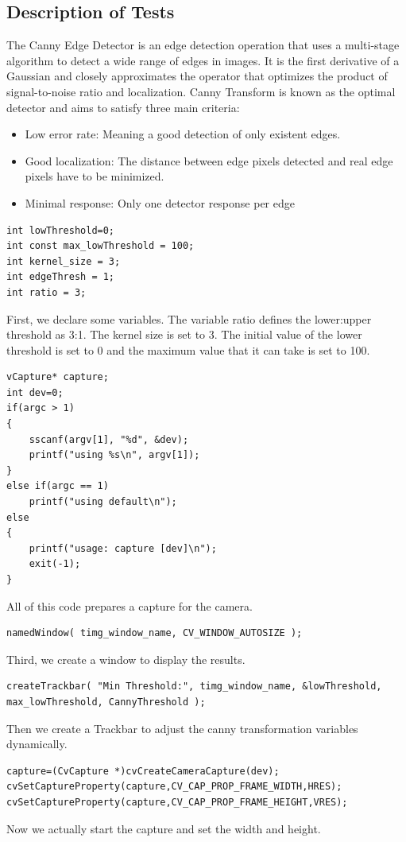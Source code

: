\documentclass{article}
\begin{document}
\subsection*{Description of Tests}
The Canny Edge Detector is an edge detection operation that uses a multi-stage algorithm to detect a wide range of edges in images. It is the first derivative of a Gaussian and closely approximates the operator that optimizes the product of signal-to-noise ratio and localization. Canny Transform is known as the optimal detector and aims to satisfy three main criteria:
\begin{itemize}
	\item Low error rate: Meaning a good detection of only existent edges. 
	\item  Good localization: The distance between edge pixels detected and real edge pixels have to be minimized. 
	\item  Minimal response: Only one detector response per edge
\end{itemize}
\begin{lstlisting}
int lowThreshold=0; 
int const max_lowThreshold = 100; 
int kernel_size = 3;
int edgeThresh = 1; 
int ratio = 3;
\end{lstlisting}
First, we declare some variables. The variable ratio defines the lower:upper threshold as 3:1. The kernel size is set to  3. The initial value of the lower threshold is set to 0 and the maximum value that it can take is set to 100.
\begin{lstlisting}
vCapture* capture;
int dev=0; 
if(argc > 1)
{
    sscanf(argv[1], "%d", &dev);
    printf("using %s\n", argv[1]);
}
else if(argc == 1)
    printf("using default\n");
else
{
    printf("usage: capture [dev]\n");
    exit(-1);
}
\end{lstlisting}
All of this code prepares a capture for the camera.

\begin{lstlisting}
namedWindow( timg_window_name, CV_WINDOW_AUTOSIZE );
\end{lstlisting}
Third, we create a window to display the results.


\begin{lstlisting}
createTrackbar( "Min Threshold:", timg_window_name, &lowThreshold, max_lowThreshold, CannyThreshold );
\end{lstlisting}
Then we create a Trackbar to adjust the canny transformation variables dynamically.
\begin{lstlisting}
capture=(CvCapture *)cvCreateCameraCapture(dev);
cvSetCaptureProperty(capture,CV_CAP_PROP_FRAME_WIDTH,HRES);
cvSetCaptureProperty(capture,CV_CAP_PROP_FRAME_HEIGHT,VRES);
\end{lstlisting}
Now we actually start the capture and set the width and height.
\end{document}

